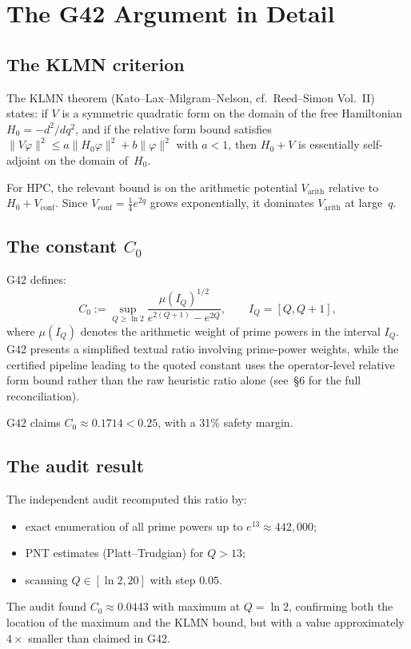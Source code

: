 \documentclass[11pt,a4paper]{article}
\begin{document}
\section{The G42 Argument in Detail}

\subsection{The KLMN criterion}

The KLMN theorem (Kato--Lax--Milgram--Nelson, cf.~Reed--Simon Vol.~II) states: if $V$ is a symmetric quadratic form on the domain of the free Hamiltonian $H_0=-d^2/dq^2$, and if the relative form bound satisfies $\|V\varphi\|^2 \le a\|H_0\varphi\|^2 + b\|\varphi\|^2$ with $a<1$, then $H_0+V$ is essentially self-adjoint on the domain of~$H_0$.

For $\mathrm{HPC}$, the relevant bound is on the arithmetic potential $V_{\text{arith}}$ relative to $H_0 + V_{\text{conf}}$.  Since $V_{\text{conf}} = \tfrac{1}{4}e^{2q}$ grows exponentially, it dominates $V_{\text{arith}}$ at large~$q$.

\subsection{The constant $C_0$}

G42 defines:
\[
C_0 := \sup_{Q\ge\ln 2} \frac{\mu(I_Q)^{1/2}}{e^{2(Q+1)}-e^{2Q}}, \qquad I_Q=[Q,Q+1],
\]
where $\mu(I_Q)$ denotes the arithmetic weight of prime powers in the interval $I_Q$.  G42 presents a simplified textual ratio involving prime-power weights, while the certified pipeline leading to the quoted constant uses the operator-level relative form bound rather than the raw heuristic ratio alone (see~\S6 for the full reconciliation).

G42 claims $C_0\approx 0.1714 < 0.25$, with a 31\% safety margin.

\subsection{The audit result}

The independent audit recomputed this ratio by:
\begin{itemize}[nosep]
    \item exact enumeration of all prime powers up to $e^{13}\approx 442{,}000$;
    \item PNT estimates (Platt--Trudgian) for $Q>13$;
    \item scanning $Q\in[\ln 2, 20]$ with step $0.05$.
\end{itemize}
The audit found $C_0\approx 0.0443$ with maximum at $Q=\ln 2$, confirming both the location of the maximum and the KLMN bound, but with a value approximately $4\times$ smaller than claimed in G42.
\end{document}
